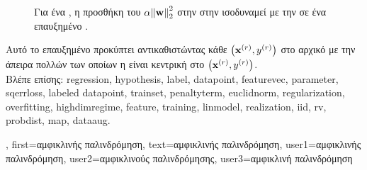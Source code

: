 {{\begin{figure}[H]
\begin{center}
			{
			\caption{\foreignlanguage{greek}{Για ένα} , \foreignlanguage{greek}{η προσθήκη του} 
				 $\regparam \normgeneric{\weights}{2}^2$ \foreignlanguage{greek}{στην}  
				\foreignlanguage{greek}{στην}  \foreignlanguage{greek}{ισοδυναμεί με την}  
				\foreignlanguage{greek}{σε ένα επαυξημένο} .  \label{fig_ridge_regression_dict} } }
			\end{center}
		\end{figure} 
		\foreignlanguage{greek}{Αυτό το επαυξημένο}  \foreignlanguage{greek}{προκύπτει αντικαθιστώντας κάθε} 
		 $\left( {\bf x}^{(r)},y^{(r)} \right)$ \foreignlanguage{greek}{στο αρχικό} 
		 \foreignlanguage{greek}{με την}  \foreignlanguage{greek}{άπειρα πολλών} 
		  \foreignlanguage{greek}{των οποίων η}  \foreignlanguage{greek}{είναι 
		κεντρική στο} $\left( {\bf x}^{(r)},y^{(r)} \right)$.
		\\
	    	\foreignlanguage{greek}{Βλέπε επίσης:} \gls{regression}, \gls{hypothesis}, \gls{label}, \gls{datapoint}, \gls{featurevec}, 
		\gls{parameter}, \gls{sqerrloss}, \gls{labeled datapoint}, \gls{trainset}, \gls{penaltyterm}, \gls{euclidnorm}, \gls{regularization}, \gls{overfitting}, 
		\gls{highdimregime}, \gls{feature}, \gls{training}, \gls{linmodel}, \gls{realization}, \gls{iid}, \gls{rv}, \gls{probdist}, \gls{map}, \gls{dataaug}. },
	    first={\foreignlanguage{greek}{αμφικλινής παλινδρόμηση}},
	    text={\foreignlanguage{greek}{αμφικλινής παλινδρόμηση}},
	    user1={\foreignlanguage{greek}{αμφικλινής παλινδρόμηση}}, %
	    user2={\foreignlanguage{greek}{αμφικλινούς παλινδρόμησης}}, %
	    user3={\foreignlanguage{greek}{αμφικλινή παλινδρόμηση}} %
}

